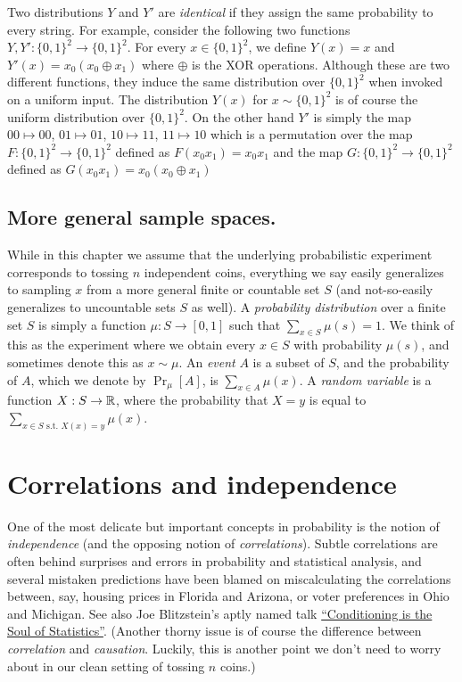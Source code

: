 Two distributions \(Y\) and \(Y'\) are \emph{identical} if they assign
the same probability to every string. For example, consider the
following two functions \(Y,Y':\{0,1\}^2 \rightarrow \{0,1\}^2\). For
every \(x \in \{0,1\}^2\), we define \(Y(x)=x\) and
\(Y'(x)=x_0(x_0\oplus x_1)\) where \(\oplus\) is the XOR operations.
Although these are two different functions, they induce the same
distribution over \(\{0,1\}^2\) when invoked on a uniform input. The
distribution \(Y(x)\) for \(x\sim \{0,1\}^2\) is of course the uniform
distribution over \(\{0,1\}^2\). On the other hand \(Y'\) is simply the
map \(00 \mapsto 00\), \(01 \mapsto 01\), \(10 \mapsto 11\),
\(11 \mapsto 10\) which is a permutation over the map
\(F:\{0,1\}^2 \rightarrow \{0,1\}^2\) defined as \(F(x_0x_1)=x_0x_1\)
and the map \(G:\{0,1\}^2 \rightarrow \{0,1\}^2\) defined as
\(G(x_0x_1)=x_0(x_0 \oplus x_1)\)

\subsection{More general sample
spaces.}\label{More-general-sample-space}

While in this chapter we assume that the underlying probabilistic
experiment corresponds to tossing \(n\) independent coins, everything we
say easily generalizes to sampling \(x\) from a more general finite or
countable set \(S\) (and not-so-easily generalizes to uncountable sets
\(S\) as well). A \emph{probability distribution} over a finite set
\(S\) is simply a function \(\mu : S \rightarrow [0,1]\) such that
\(\sum_{x\in S}\mu(s)=1\). We think of this as the experiment where we
obtain every \(x\in S\) with probability \(\mu(s)\), and sometimes
denote this as \(x\sim \mu\). An \emph{event} \(A\) is a subset of
\(S\), and the probability of \(A\), which we denote by \(\Pr_\mu[A]\),
is \(\sum_{x\in A} \mu(x)\). A \emph{random variable} is a function
\(X:S \rightarrow {\mathbb{R}}\), where the probability that \(X=y\) is equal to
\(\sum_{x\in S \text{ s.t. } X(x)=y} \mu(x)\).

\section{Correlations and independence}\label{Correlations-and-independ}

One of the most delicate but important concepts in probability is the
notion of \emph{independence} (and the opposing notion of
\emph{correlations}). Subtle correlations are often behind surprises and
errors in probability and statistical analysis, and several mistaken
predictions have been blamed on miscalculating the correlations between,
say, housing prices in Florida and Arizona, or voter preferences in Ohio
and Michigan. See also Joe Blitzstein's aptly named talk
\href{https://youtu.be/dzFf3r1yph8}{``Conditioning is the Soul of
Statistics''}. (Another thorny issue is of course the difference between
\emph{correlation} and \emph{causation}. Luckily, this is another point
we don't need to worry about in our clean setting of tossing \(n\)
coins.)

